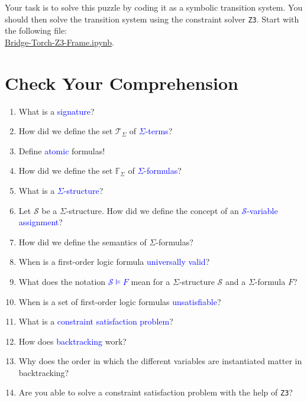 \noindent
Your task is to solve this puzzle by coding it as a symbolic transition system.  You should then solve the
transition system using the constraint solver \texttt{Z3}.
Start with the following file:
\\[0.2cm]
\hspace*{1.3cm}
\href{https://github.com/karlstroetmann/Logic/blob/master/TypeScript/Chapter-5/Bridge-Torch-Z3-Frame.ipynb}{Bridge-Torch-Z3-Frame.ipynb}.
\eox


\section{Check Your Comprehension}
\begin{enumerate}
\item What is a \textcolor{blue}{signature}?
\item How did we define the set $\mathcal{T}_\Sigma$ of \textcolor{blue}{$\Sigma$-terms}?
\item Define \textcolor{blue}{atomic} formulas!
\item How did we define the set $\mathbb{F}_\Sigma$ of \textcolor{blue}{$\Sigma$-formulas}?
\item What is a \textcolor{blue}{$\Sigma$-structure}?
\item Let $\mathcal{S}$ be a $\Sigma$-structure. How did we define the concept of
      an \textcolor{blue}{$\mathcal{S}$-variable assignment}?
\item How did we define the semantics of $\Sigma$-formulas?
\item When is a first-order logic formula \textcolor{blue}{universally valid}?
\item What does the notation \textcolor{blue}{$\mathcal{S} \models F$} mean for a $\Sigma$-structure $\mathcal{S}$ and a
      $\Sigma$-formula $F$?
\item When is a set of first-order logic formulas \textcolor{blue}{unsatisfiable}?
\item What is a \textcolor{blue}{constraint satisfaction problem}?
\item How does \textcolor{blue}{backtracking} work?
\item Why does the order in which the different variables are instantiated matter in backtracking?
\item Are you able to solve a constraint satisfaction problem with the help of \texttt{Z3}?
\end{enumerate}

